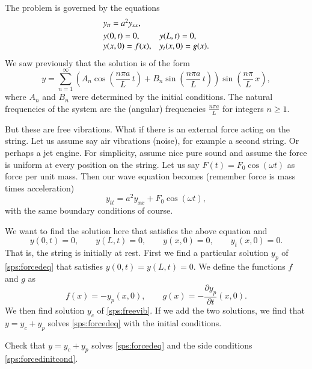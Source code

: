 \documentclass[12pt]{book}
\begin{document}
The problem is governed by the equations
\begin{equation} \label{sps:freevib}
\begin{array}{ll}
y_{tt} = a^2 y_{xx} , & \\
\noalign{\smallskip}
y(0,t) = 0 , & y(L,t) = 0 , \\
y(x,0) = f(x) , & y_t(x,0) = g(x) .
\end{array}
\end{equation}
We saw previously that 
the solution is of the form
\begin{equation*}
y = 
\sum_{n=1}^\infty \left( A_n \cos \left( \frac{n\pi a}{L} \, t \right) +
B_n \sin \left( \frac{n\pi a}{L} \, t \right) \right)
\sin \left( \frac{n\pi}{L} \, x \right) ,
\end{equation*}
where $A_n$ and $B_n$ were determined by the initial conditions.  The natural
frequencies of the system are the (angular) frequencies $\frac{n \pi a}{L}$
for integers $n \geq 1$.

But these are free vibrations.  What if there is an external force acting on
the string.  Let us assume say air vibrations (noise), for example a second
string.  Or perhaps a jet engine.  For simplicity, assume nice pure
sound and assume the force is uniform at every position on the string.
Let us say $F(t) = F_0 \cos (\omega t)$ as force per unit mass.  Then our wave
equation becomes (remember force is mass times acceleration)
\begin{equation} \label{sps:forcedeq}
y_{tt} = a^2 y_{xx} + F_0 \cos ( \omega t) ,
\end{equation}
with the same boundary conditions of course.

We want to find the solution here that satisfies the above equation and
\begin{equation} \label{sps:forcedinitcond}
y(0,t) = 0, \qquad y(L,t) = 0, \qquad
y(x,0) = 0, \qquad y_t(x,0) = 0.
\end{equation}
That is, the string is initially at rest.  First we find a particular
solution $y_p$ of \eqref{sps:forcedeq} that satisfies
$y(0,t) = y(L,t) = 0$.  We define the functions $f$ and $g$ as
\begin{equation*}
f(x) = -y_p(x,0), \qquad g(x) = -\frac{\partial y_p}{\partial t} (x,0) .
\end{equation*}
We then find solution $y_c$ of \eqref{sps:freevib}.  If we add the two
solutions, we find that $y = y_c + y_p$ solves \eqref{sps:forcedeq} with
the initial conditions.

\begin{exercise}
Check that $y = y_c + y_p$ solves \eqref{sps:forcedeq} and the
side conditions \eqref{sps:forcedinitcond}.
\end{exercise}
\end{document}
